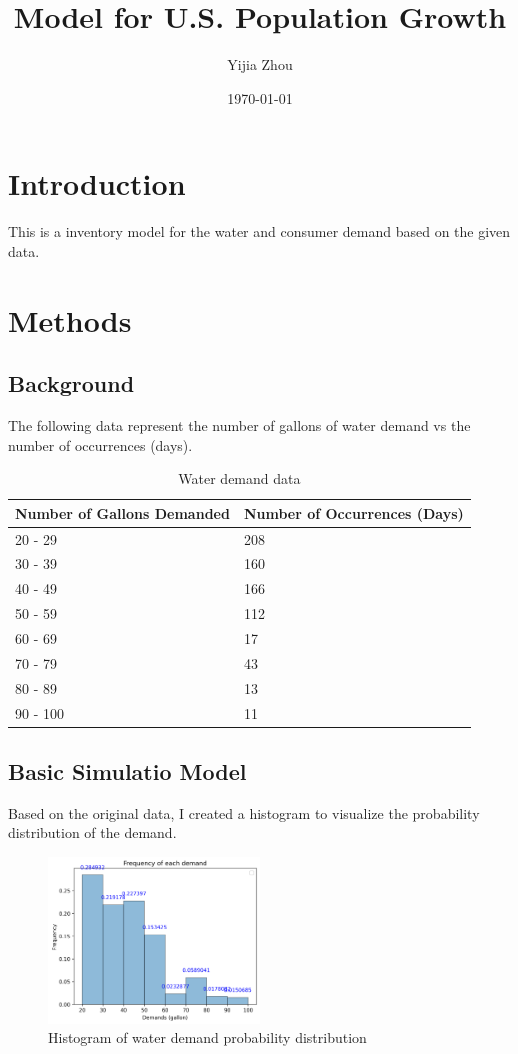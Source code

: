 \documentclass[11pt]{article}
\title{Model for U.S. Population Growth}
\author{Yijia Zhou}
\date{\today}
\begin{document}
\maketitle


\section{Introduction}
This is a inventory model for the water and consumer demand based on the given data.

\section{Methods}
\subsection{Background}
The following data represent the number of gallons of water demand vs the number of occurrences (days). 

\begin{table}[H]
    \centering
    \begin{tabular}{ll}
        \toprule
        Number of Gallons Demanded & Number of Occurrences (Days) \\
        \midrule
        20 - 29 & 208 \\
        30 - 39 & 160 \\
        40 - 49 & 166 \\
        50 - 59 & 112 \\
        60 - 69 & 17 \\
        70 - 79 & 43 \\
        80 - 89 & 13 \\
        90 - 100 & 11 \\
        \bottomrule
    \end{tabular}
    \caption{Water demand data}
\end{table}


\subsection{Basic Simulatio Model}
Based on the original data, I created a histogram to visualize the probability distribution of the demand.

\begin{figure}[H]
    \centering
    \includegraphics[width=0.5\textwidth]{histogram}
    \caption{Histogram of water demand probability distribution}
    \label{histogram}
\end{figure}
\end{document}
